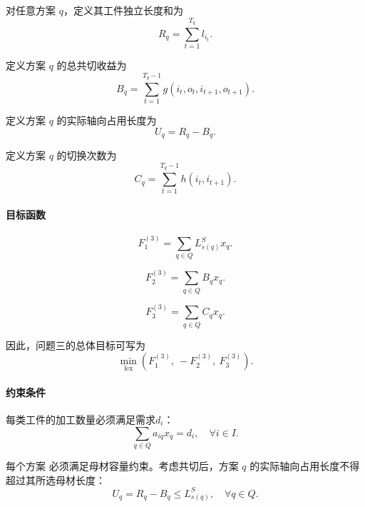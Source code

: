 \documentclass[UTF8]{ctexart}
\begin{document}
对任意方案 $q$，定义其工件独立长度和为
\begin{equation}
R_q=\sum_{t=1}^{T_q}l_{i_t}.
\label{eq:p3_Rq}
\end{equation}

定义方案 $q$ 的总共切收益为
\begin{equation}
B_q=
\sum_{t=1}^{T_q-1}
g(i_t,o_t,i_{t+1},o_{t+1}).
\label{eq:p3_Bq}
\end{equation}

定义方案 $q$ 的实际轴向占用长度为
\begin{equation}
U_q=R_q-B_q.
\label{eq:p3_Uq}
\end{equation}

定义方案 $q$ 的切换次数为
\begin{equation}
C_q=
\sum_{t=1}^{T_q-1}
h(i_t,i_{t+1}).
\label{eq:p3_Cq}
\end{equation}

\paragraph{目标函数}

\begin{equation}
F_1^{(3)}=\sum_{q\in Q}L_{s(q)}^S x_q.
\label{eq:p3_F1}
\end{equation}

\begin{equation}
F_2^{(3)}=\sum_{q\in Q}B_q x_q.
\label{eq:p3_F2}
\end{equation}

\begin{equation}
F_3^{(3)}=\sum_{q\in Q}C_q x_q.
\label{eq:p3_F3}
\end{equation}

因此，问题三的总体目标可写为
\begin{equation}
\min_{\mathrm{lex}}\left(F_1^{(3)},\ -F_2^{(3)},\ F_3^{(3)}\right).
\label{eq:p3_lex}
\end{equation}

\paragraph{约束条件}

每类工件的加工数量必须满足需求$d_i$：
\begin{equation}
\sum_{q\in Q}a_{iq}x_q=d_i,
\quad \forall i\in I.
\label{eq:p3_demand}
\end{equation}

每个方案 必须满足母材容量约束。考虑共切后，方案 $q$ 的实际轴向占用长度不得超过其所选母材长度：
\begin{equation}
U_q=R_q-B_q\leq L_{s(q)}^S,
\quad \forall q\in Q.
\label{eq:p3_capacity}
\end{equation}
\end{document}
